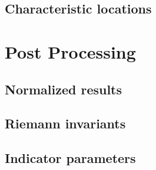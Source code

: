 \subsection{Characteristic locations}\label{characteristic-locations}

\section{Post Processing}\label{post-processing}

\subsection{Normalized results}\label{normalized-results}

\subsection{Riemann invariants}\label{riemann-invariants}

\subsection{Indicator parameters}\label{indicator-parameters}
